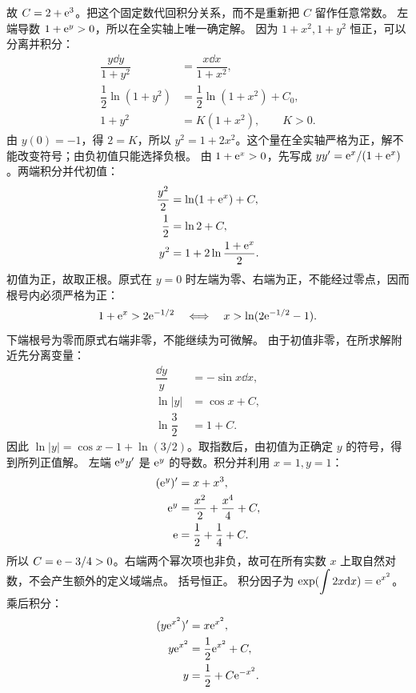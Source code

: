 故 $C=2+\mathrm e^3$。把这个固定数代回积分关系，而不是重新把 $C$ 留作任意常数。
左端导数 $1+\mathrm e^y>0$，所以在全实轴上唯一确定解。
因为 $1+x^2,1+y^2$ 恒正，可以分离并积分：
\[
\begin{aligned}
\dfrac{y\dd y}{1+y^2}&=\dfrac{x\dd x}{1+x^2},\\
\dfrac12\ln(1+y^2)&=\dfrac12\ln(1+x^2)+C_0,\\
1+y^2&=K(1+x^2),\qquad K>0.
\end{aligned}
\]
由 $y(0)=-1$，得 $2=K$，所以 $y^2=1+2x^2$。这个量在全实轴严格为正，解不能改变符号；由负初值只能选择负根。
由 $1+\mathrm e^x>0$，先写成 $yy'=\mathrm e^x/(1+\mathrm e^x)$。两端积分并代初值：
\[
\begin{aligned}
\dfrac{y^2}{2}&=\ln(1+\mathrm e^x)+C,\\
\dfrac12&=\ln2+C,\\
y^2&=1+2\ln\dfrac{1+\mathrm e^x}{2}.
\end{aligned}
\]
初值为正，故取正根。原式在 $y=0$ 时左端为零、右端为正，不能经过零点，因而根号内必须严格为正：
\[
1+\mathrm e^x>2\mathrm e^{-1/2}\quad\Longleftrightarrow\quad
x>\ln(2\mathrm e^{-1/2}-1).
\]
下端根号为零而原式右端非零，不能继续为可微解。
由于初值非零，在所求解附近先分离变量：
\[
\begin{aligned}
\dfrac{\dd y}y&=-\sin x\dd x,\\
\ln|y|&=\cos x+C,\\
\ln\dfrac32&=1+C.
\end{aligned}
\]
因此 $\ln|y|=\cos x-1+\ln(3/2)$。取指数后，由初值为正确定 $y$ 的符号，得到所列正值解。
左端 $\mathrm e^y y'$ 是 $\mathrm e^y$ 的导数。积分并利用 $x=1,y=1$：
\[
\begin{aligned}
(\mathrm e^y)'&=x+x^3,\\
\mathrm e^y&=\dfrac{x^2}{2}+\dfrac{x^4}{4}+C,\\
\mathrm e&=\dfrac12+\dfrac14+C.
\end{aligned}
\]
所以 $C=\mathrm e-3/4>0$。右端两个幂次项也非负，故可在所有实数 $x$ 上取自然对数，不会产生额外的定义域端点。
括号恒正。
积分因子为 $\displaystyle \exp(\int2x\mathrm d x)=\mathrm e^{x^2}$。乘后积分：
\[
\begin{aligned}
(y\mathrm e^{x^2})'&=x\mathrm e^{x^2},\\
y\mathrm e^{x^2}&=\dfrac12\mathrm e^{x^2}+C,\\
y&=\dfrac12+C\mathrm e^{-x^2}.
\end{aligned}
\]
